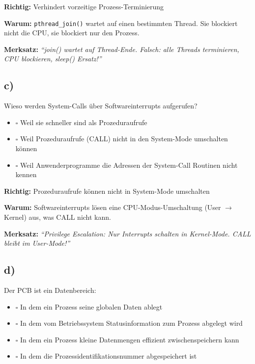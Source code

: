 \documentclass[a4paper,11pt]{article}
\begin{document}
\begin{tcolorbox}[colback=green!15!white,colframe=green!70!black,title=\textbf{Lösung Aufgabe 7b}]
\textbf{Richtig:} \checkmark Verhindert vorzeitige Prozess-Terminierung

\textbf{Warum:} \texttt{pthread\_join()} wartet auf einen bestimmten Thread. Sie blockiert nicht die CPU, sie blockiert nur den Prozess.

\textbf{Merksatz:} \textit{``join() wartet auf Thread-Ende. Falsch: alle Threads terminieren, CPU blockieren, sleep() Ersatz!''}
\end{tcolorbox}

\subsection*{c)}
Wieso werden System-Calls über Softwareinterrupts aufgerufen?
\begin{itemize}[leftmargin=*]
  \item $\square$ Weil sie schneller sind als Prozeduraufrufe
  \item $\square$ Weil Prozeduraufrufe (CALL) nicht in den System-Mode umschalten können
  \item $\square$ Weil Anwenderprogramme die Adressen der System-Call Routinen nicht kennen
\end{itemize}

\begin{tcolorbox}[colback=green!15!white,colframe=green!70!black,title=\textbf{Lösung Aufgabe 7c}]
\textbf{Richtig:} \checkmark Prozeduraufrufe können nicht in System-Mode umschalten

\textbf{Warum:} Softwareinterrupts lösen eine CPU-Modus-Umschaltung (User $\rightarrow$ Kernel) aus, was CALL nicht kann.

\textbf{Merksatz:} \textit{``Privilege Escalation: Nur Interrupts schalten in Kernel-Mode. CALL bleibt im User-Mode!''}
\end{tcolorbox}

\subsection*{d)}
Der PCB ist ein Datenbereich:
\begin{itemize}[leftmargin=*]
  \item $\square$ In dem ein Prozess seine globalen Daten ablegt
  \item $\square$ In dem vom Betriebssystem Statusinformation zum Prozess abgelegt wird
  \item $\square$ In dem ein Prozess kleine Datenmengen effizient zwischenspeichern kann
  \item $\square$ In dem die Prozessidentifikationsnummer abgespeichert ist
\end{itemize}
\end{document}
